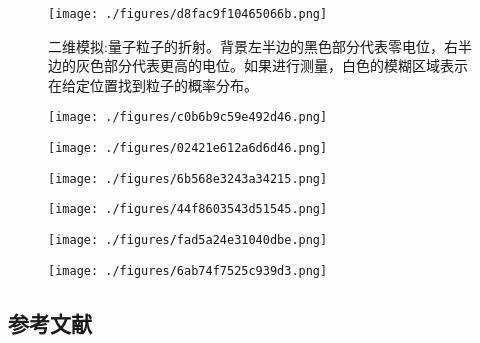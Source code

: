 \begin{figure}[ht]
\centering
\texttt{[image: ./figures/d8fac9f10465066b.png]}
\caption{二维模拟:量子粒子的折射。背景左半边的黑色部分代表零电位，右半边的灰色部分代表更高的电位。如果进行测量，白色的模糊区域表示在给定位置找到粒子的概率分布。} \label{fig_ZS_10}
\end{figure}

\begin{figure}[ht]
\centering
\texttt{[image: ./figures/c0b6b9c59e492d46.png]}
\caption\label{fig_ZS_11}
\end{figure}

\begin{figure}[ht]
\centering
\texttt{[image: ./figures/02421e612a6d6d46.png]}
\caption\label{fig_ZS_12}
\end{figure}

\begin{figure}[ht]
\centering
\texttt{[image: ./figures/6b568e3243a34215.png]}
\caption \label{fig_ZS_13}
\end{figure}

\begin{figure}[ht]
\centering
\texttt{[image: ./figures/44f8603543d51545.png]}
\caption\label{fig_ZS_14}
\end{figure}

\begin{figure}[ht]
\centering
\texttt{[image: ./figures/fad5a24e31040dbe.png]}
\caption \label{fig_ZS_15}
\end{figure}

\begin{figure}[ht]
\centering
\texttt{[image: ./figures/6ab74f7525c939d3.png]}
\caption \label{fig_ZS_16}
\end{figure}

\subsection{参考文献}

